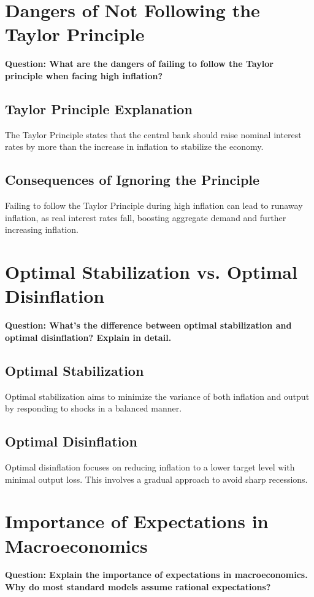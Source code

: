 \documentclass{article}
\begin{document}
\section{Dangers of Not Following the Taylor Principle}
\textbf{Question: What are the dangers of failing to follow the Taylor principle when facing high inflation?}

\subsection{Taylor Principle Explanation}
The Taylor Principle states that the central bank should raise nominal interest rates by more than the increase in inflation to stabilize the economy.

\subsection{Consequences of Ignoring the Principle}
Failing to follow the Taylor Principle during high inflation can lead to runaway inflation, as real interest rates fall, boosting aggregate demand and further increasing inflation.

\section{Optimal Stabilization vs. Optimal Disinflation}
\textbf{Question: What’s the difference between optimal stabilization and optimal disinflation? Explain in detail.}

\subsection{Optimal Stabilization}
Optimal stabilization aims to minimize the variance of both inflation and output by responding to shocks in a balanced manner.

\subsection{Optimal Disinflation}
Optimal disinflation focuses on reducing inflation to a lower target level with minimal output loss. This involves a gradual approach to avoid sharp recessions.

\section{Importance of Expectations in Macroeconomics}
\textbf{Question: Explain the importance of expectations in macroeconomics. Why do most standard models assume rational expectations?}
\end{document}
